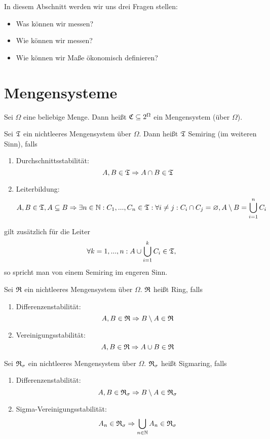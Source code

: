In diesem Abschnitt werden wir uns drei Fragen stellen:
	\begin{itemize}
		\item Was können wir messen?
		\item Wie können wir messen?
		\item Wie können wir Maße ökonomisch definieren?
	\end{itemize}
	
	\section{Mengensysteme}
		\begin{defi}
			Sei $\Omega$ eine beliebige Menge. Dann heißt $\mathfrak{C}\subseteq 2^\Omega$ ein Mengensystem (über $\Omega$).
		\end{defi}
		
		\begin{defi} [Semiring]
			Sei $\mathfrak{T}$ ein nichtleeres Mengensystem über $\Omega$. Dann heißt $\mathfrak{T}$ Semiring (im weiteren Sinn), falls
			\begin{enumerate}
				\item Durchschnittsstabilität:
				\[ A,B\in\mathfrak{T}\Rightarrow A\cap B\in\mathfrak{T} \]
				\item Leiterbildung:
				\[ A,B\in\mathfrak{T}, A\subseteq B\Rightarrow \exists n\in\mathbb{N}: C_1,...,C_n\in\mathfrak{T}: \forall i\neq j: C_i\cap C_j=\varnothing, A\setminus B=\bigcup_{i=1}^n C_i \]
			\end{enumerate}
			gilt zusätzlich für die Leiter
			\[ \forall k=1,...,n: A\cup\bigcup_{i=1}^k C_i\in\mathfrak{T}, \]
			so spricht man von einem Semiring im engeren Sinn.
		\end{defi}
		
		\begin{defi}[Ring]
			Sei $\mathfrak{R}$ ein nichtleeres Mengensystem über $\Omega$. $\mathfrak{R}$ heißt Ring, falls
			\begin{enumerate}
				\item Differenzenstabilität:
				\[ A,B\in\mathfrak{R}\Rightarrow B\setminus A\in\mathfrak{R} \]
				\item Vereinigungsstabilität:
				\[ A,B\in\mathfrak{R}\Rightarrow A\cup B\in\mathfrak{R} \]
			\end{enumerate}
		\end{defi}
		
		\begin{defi}[Sigmaring]
			Sei $\mathfrak{R}_\sigma$ ein nichtleeres Mengensystem über $\Omega$. $\mathfrak{R}_\sigma$ heißt Sigmaring, falls
			\begin{enumerate}
				\item Differenzenstabilität:
				\[ A,B\in\mathfrak{R}_\sigma\Rightarrow B\setminus A\in\mathfrak{R}_\sigma \]
				\item Sigma-Vereinigungsstabilität:
				\[ A_n\in\mathfrak{R}_\sigma\Rightarrow \bigcup_{n\in\mathbb{N}}A_n\in\mathfrak{R}_\sigma \]
			\end{enumerate}
		\end{defi}
		
